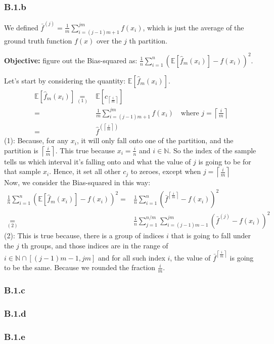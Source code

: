 \documentclass[]{article}
\begin{document}
    \subsubsection*{B.1.b}
        \hspace{1.1em}
        We defined $\bar{f}^{(j)}=\frac{1}{m}\sum_{i = (j - 1)m + 1}^{jm}f\left(x_i\right)$, which is just the average of the ground truth function $f(x)$ over the $j$ th partition. 
        \par
        \textbf{Objective: } figure out the Bias-squared as: $\frac{1}{n}\sum_{i = 1}^{n}\left(\mathbb{E}\left[\hat{f}_m(x_i)\right] - f(x_i)\right)^2$. 
        \par
        Let's start by considering the quantity: $\mathbb{E}\left[\hat{f}_m(x_i)\right]$. 
        \begin{align*}\tag{B.1.b.1}\label{eqn:B.1.b.1}
            \mathbb{E}\left[\hat{f}_m(x_i)\right] \underset{(1)}{=}&
            \mathbb{E}\left[c_{\left\lceil\frac{i}{m}\right\rceil}\right]
            \\
            =& 
            \frac{1}{m}\sum_{i=(j - 1)m + 1}^{jm}f(x_i) \quad \text{where } j = 
            \left\lceil\frac{i}{m}\right\rceil
            \\
            =&
            \hat{f}^{(\left\lceil\frac{i}{m}\right\rceil) }
        \end{align*}
        (1): Because, for any $x_i$, it will only fall onto one of the partition, and the partition is $\left\lceil \frac{i}{m}\right\rceil$. This true because $x_i = \frac{i}{n}$ and $i\in\mathbb{N}$. So the index of the sample tells us which interval it's falling onto and what the value of $j$ is going to be for that sample $x_i$. Hence, it set all other $c_j$ to zeroes, except when $j = \left\lceil\frac{i}{m}\right\rceil$
        \\[1em]
        Now, we consider the Bias-squared in this way: 
        \begin{align*}\tag{B.1.b.2}\label{eqn:B.1.b.2}
            \frac{1}{n}\sum_{i = 1}^{n}\left(\mathbb{E}\left[\hat{f}_m(x_i)\right] - f(x_i)\right)^2
            =&
            \frac{1}{n}\sum_{i = 1}^{n}\left(
                \bar{f}^{\left\lceil\frac{i}{m}\right\rceil}
                -
                f(x_i)
            \right)^2
            \\
            \underset{(2)}{=}&
            \frac{1}{n}\sum_{j = 1}^{n/m}\sum_{i = (j - 1)m - 1}^{jm}\left(
                \bar{f}^{(j)} - f(x_i)
            \right)^2
        \end{align*}
        (2): This is true because, there is a group of indices $i$ that is going to fall under the $j$ th groups, and those indices are in the range of $i \in \mathbb{N}\cap [(j - 1)m - 1, jm]$ and for all such index $i$, the value of $\bar{f}^{\left\lceil\frac{i}{m}\right\rceil}$ is going to be the same. Because we rounded the fraction $\frac{i}{m}$.
    \subsubsection*{B.1.c}
        
    \subsubsection*{B.1.d}
    \subsubsection*{B.1.e}
\end{document}
